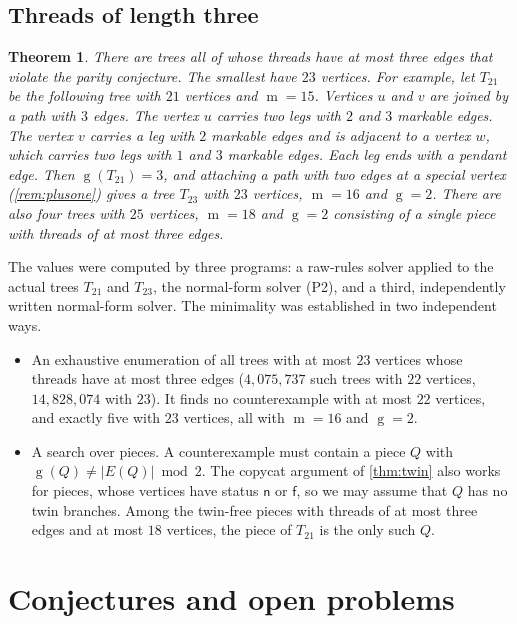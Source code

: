 \documentclass[11pt]{amsart}
\newtheorem{theorem}{Theorem}[section]
\theoremstyle{definition}
\theoremstyle{remark}
\newcommand{\gv}{\operatorname{g}}           %
\newcommand{\m}{\operatorname{m}}
\newcommand{\sn}{\mathsf{n}}
\newcommand{\sff}{\mathsf{f}}
\begin{document}
\subsection{Threads of length three}

\begin{theorem}\label{thm:threads3}
There are trees all of whose threads have at most three edges that violate the parity conjecture.
The smallest have $23$ vertices. For example, let $T_{21}$ be the following tree with $21$ vertices
and $\m=15$. Vertices $u$ and $v$ are joined by a path with $3$ edges. The vertex $u$ carries two
legs with $2$ and $3$ markable edges. The vertex $v$ carries a leg with $2$ markable edges and is
adjacent to a vertex $w$, which carries two legs with $1$ and $3$ markable edges. Each leg ends
with a pendant edge. Then $\gv(T_{21})=3$, and attaching a path with two edges at a special vertex
(\cref{rem:plusone}) gives a tree $T_{23}$ with $23$ vertices, $\m=16$ and $\gv=2$.
There are also four trees with $25$ vertices, $\m=18$ and $\gv=2$ consisting of a single piece with
threads of at most three edges.
\end{theorem}

The values were computed by three programs: a raw-rules solver applied to the actual trees $T_{21}$ and $T_{23}$, the normal-form solver (P2), and a third, independently written normal-form solver. The minimality was established in two independent ways.
\begin{itemize}[leftmargin=*]
\item An exhaustive enumeration of all trees with at most $23$ vertices whose threads have at most three edges ($4{,}075{,}737$ such trees with $22$ vertices, $14{,}828{,}074$ with $23$). It finds no counterexample with at most $22$ vertices, and exactly five with $23$ vertices, all with $\m=16$ and $\gv=2$.
\item A search over pieces. A counterexample must contain a piece $Q$ with $\gv(Q)\ne|E(Q)|\bmod 2$. The copycat argument of \cref{thm:twin} also works for pieces, whose vertices have status $\sn$ or $\sff$, so we may assume that $Q$ has no twin branches. Among the twin-free pieces with threads of at most three edges and at most $18$ vertices, the piece of $T_{21}$ is the only such $Q$.
\end{itemize}

\section{Conjectures and open problems}\label{sec:open}
\end{document}

